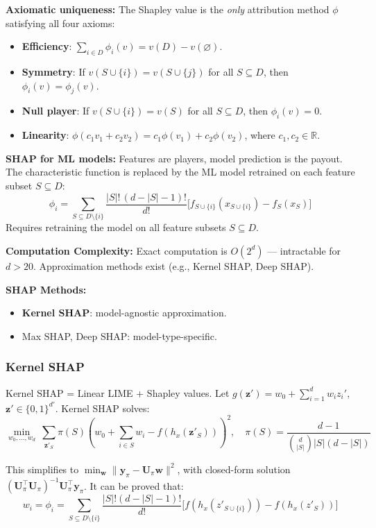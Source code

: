 \documentclass[UTF8]{ctexart}
\begin{document}
\textbf{Axiomatic uniqueness:} The Shapley value is the \emph{only} attribution method $\phi$ satisfying all four axioms:
\begin{itemize}
    \item \textbf{Efficiency}: $\sum_{i \in D} \phi_i(v) = v(D) - v(\varnothing)$.
    \item \textbf{Symmetry}: If $v(S \cup \{i\}) = v(S \cup \{j\})$ for all $S \subseteq D$, then $\phi_i(v) = \phi_j(v)$.
    \item \textbf{Null player}: If $v(S \cup \{i\}) = v(S)$ for all $S \subseteq D$, then $\phi_i(v) = 0$.
    \item \textbf{Linearity}: $\phi(c_1 v_1 + c_2 v_2) = c_1\phi(v_1) + c_2\phi(v_2)$, where $c_1, c_2 \in \mathbb{R}$.
\end{itemize}

\textbf{SHAP for ML models:} Features are players, model prediction is the payout. The characteristic function is replaced by the ML model retrained on each feature subset $S \subseteq D$:
\[
    \phi_i = \sum_{S \subseteq D \setminus \{i\}} \frac{|S|!\,(d-|S|-1)!}{d!}\bigl[f_{S \cup \{i\}}(x_{S \cup \{i\}}) - f_S(x_S)\bigr]
\]
Requires retraining the model on all feature subsets $S \subseteq D$.

\textbf{Computation Complexity:} Exact computation is $O(2^d)$ — intractable for $d > 20$. Approximation methods exist (e.g., Kernel SHAP, Deep SHAP).

\textbf{SHAP Methods:}
\begin{itemize}
    \item \textbf{Kernel SHAP}: model-agnostic approximation.
    \item Max SHAP, Deep SHAP: model-type-specific.
\end{itemize}

\subsubsection{Kernel SHAP}

Kernel SHAP = Linear LIME + Shapley values. Let $g(\mathbf{z}') = w_0 + \sum_{i=1}^d w_i z_i'$, $\mathbf{z}' \in \{0,1\}^{d'}$. Kernel SHAP solves:
\[
    \min_{w_0,\ldots,w_d}\ \sum_{\mathbf{z}'_S} \pi(S)\!\left(w_0 + \sum_{i \in S} w_i - f(h_x(\mathbf{z}'_S))\right)^2, \quad
    \pi(S) = \frac{d-1}{\binom{d}{|S|}|S|(d-|S|)}
\]

This simplifies to $\min_{\mathbf{w}} \|\mathbf{y}_\pi - \mathbf{U}_\pi \mathbf{w}\|^2$, with closed-form solution $(\mathbf{U}_\pi^\top \mathbf{U}_\pi)^{-1}\mathbf{U}_\pi^\top \mathbf{y}_\pi$. It can be proved that:
\[
    w_i = \phi_i = \sum_{S \subseteq D \setminus \{i\}} \frac{|S|!(d-|S|-1)!}{d!}\bigl[f(h_x(z'_{S\cup\{i\}})) - f(h_x(z'_S))\bigr]
\]
\end{document}
